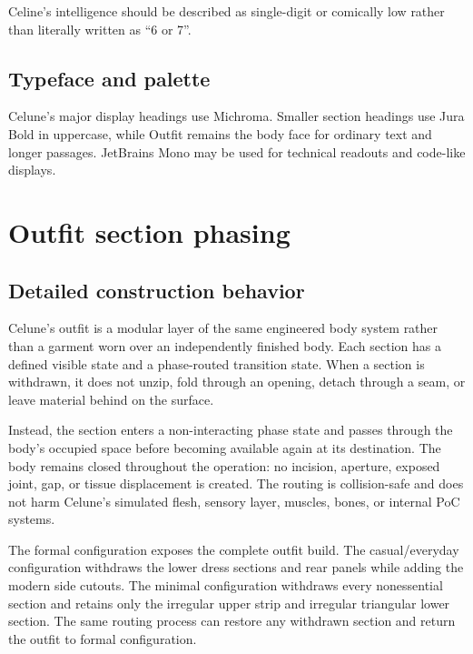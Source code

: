 \documentclass[10pt]{article}
\begin{document}
Celine's intelligence should be described as single-digit or comically low rather than literally written as ``6 or 7''.

\hypertarget{typeface-and-palette}{%
\subsection{Typeface and palette}\label{typeface-and-palette}}

Celune's major display headings use Michroma. Smaller section headings use Jura Bold in uppercase, while Outfit remains the body face for ordinary text and longer passages. JetBrains Mono may be used for technical readouts and code-like displays.

\clearpage

\clearpage

\par{}\leftskip 0pt\rightskip 0pt

\section*{Outfit section phasing}
\subsection*{Detailed construction behavior}

Celune's outfit is a modular layer of the same engineered body system rather than a garment worn over an independently finished body. Each section has a defined visible state and a phase-routed transition state. When a section is withdrawn, it does not unzip, fold through an opening, detach through a seam, or leave material behind on the surface.

Instead, the section enters a non-interacting phase state and passes through the body's occupied space before becoming available again at its destination. The body remains closed throughout the operation: no incision, aperture, exposed joint, gap, or tissue displacement is created. The routing is collision-safe and does not harm Celune's simulated flesh, sensory layer, muscles, bones, or internal PoC systems.

The formal configuration exposes the complete outfit build. The casual/everyday configuration withdraws the lower dress sections and rear panels while adding the modern side cutouts. The minimal configuration withdraws every nonessential section and retains only the irregular upper strip and irregular triangular lower section. The same routing process can restore any withdrawn section and return the outfit to formal configuration.
\end{document}
